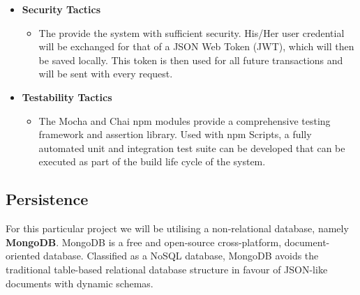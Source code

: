 \documentclass[a4paper,12pt]{article}
\begin{document}
\begin{itemize}
		\item\textbf{Security Tactics}
		\begin{itemize}
			\item The provide the system with sufficient security. His/Her user credential will be exchanged for that of a JSON Web Token (JWT), which will then be saved locally. This token is then used for all future transactions and will be sent with every request.
		\end{itemize}
		
		\newpage
		\item\textbf{Testability Tactics}
		\begin{itemize}
			\item The Mocha and Chai npm modules provide a comprehensive testing framework and assertion library. Used with npm Scripts, a fully automated unit and integration test suite can be developed that can be executed as part of the build life cycle of the system. 
		\end{itemize}
		
	\end{itemize}
	
	\newpage
	\subsection{Persistence}
	For this particular project we will be utilising a non-relational database, namely \textbf{MongoDB}. MongoDB is a free and open-source cross-platform, document-oriented database. Classified as a NoSQL database, MongoDB avoids the traditional table-based relational database structure in favour of JSON-like documents with dynamic schemas. 
	
\end{document}
